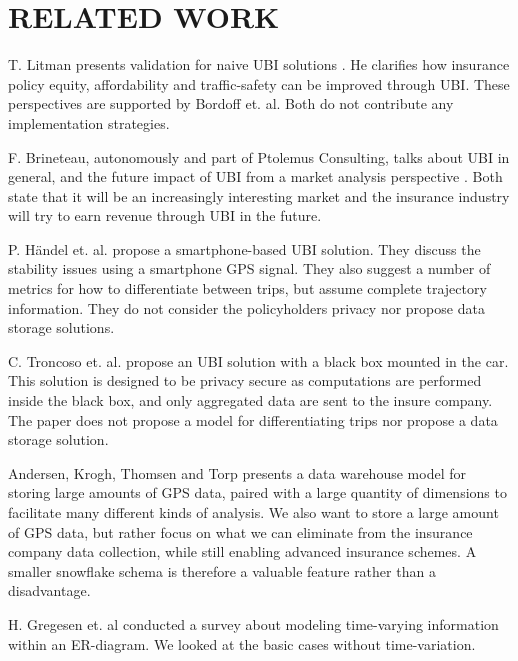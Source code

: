 \section{RELATED WORK}\label{sec:relwork}

T. Litman presents validation for naive UBI solutions\cite{art:PAYDVehInsur}\cite{art:vehicfeacosben}\cite{art:PAYDafford} . He clarifies how insurance policy equity, affordability and traffic-safety can be improved through UBI. These perspectives are supported by Bordoff et. al\cite{art:PAYDredharms}. Both do not contribute any implementation strategies.

F. Brineteau, autonomously and part of Ptolemus Consulting, talks about UBI in general, and the future impact of UBI from a market analysis perspective \cite{art:telematicsmatter}\cite{mar:telematics12}\cite{mar:ubi13}\cite{mar:ubi16}. Both state that it will be an increasingly interesting market and the insurance industry will try to earn revenue through UBI in the future.

P. Händel et. al. propose a smartphone-based UBI solution\cite{art:insurtelematics}\cite{art:smartphonemonitor}. They discuss the stability issues using a smartphone GPS signal. They also suggest a number of metrics for how to differentiate between trips, but assume complete trajectory information. They do not consider the policyholders privacy nor propose data storage solutions.

C. Troncoso et. al. propose an UBI solution with a black box mounted in the car\cite{art:PriPAYDprivacy}. This solution is designed to be privacy secure as computations are performed inside the black box, and only aggregated data are sent to the insure company. The paper does not propose a model for differentiating trips nor propose a data storage solution.

Andersen, Krogh, Thomsen and Torp presents a data warehouse model for storing large amounts of GPS data, paired with a large quantity of dimensions to facilitate many different kinds of analysis\cite{art:gpswarehouse}. We also want to store a large amount of GPS data, but rather focus on what we can eliminate from the insurance company data collection, while still enabling advanced insurance schemes. A smaller snowflake schema is therefore a valuable feature rather than a disadvantage.

H. Gregesen et. al conducted a survey about modeling time-varying information within an ER-diagram\cite{art:modeltimevary}. We looked at the basic cases without time-variation. 

